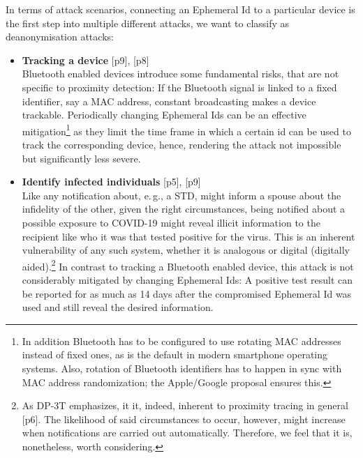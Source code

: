 \documentclass{llncs}
\begin{document}
In terms of attack scenarios, connecting an Ephemeral Id to a particular device is the first step into multiple different attacks, we want to classify as deanonymisation attacks:
\begin{itemize}
\item \textbf{Tracking a device}
  \cite{dp3t:psre}[p9], \cite{pepppt:dp3tana}[p8]\\
  Bluetooth enabled devices introduce some fundamental risks, that are not
  specific to proximity detection: If the Bluetooth signal is linked to a fixed
  identifier, say a MAC address, constant broadcasting makes
  a device trackable.
  Periodically changing Ephemeral Ids can be an effective mitigation\footnote{%
    In addition Bluetooth has to be configured to use rotating MAC addresses
    instead of fixed ones, as is the default in modern smartphone operating
    systems. Also, rotation of Bluetooth identifiers has to happen
    in sync with MAC address randomization; the Apple/Google proposal
    \cite{enf:bluetooth} ensures this.}
  as they limit the time frame in which a certain id can be used to
  track the corresponding device, hence, rendering the attack not impossible
  but significantly less severe.
\item \textbf{Identify infected individuals}
  \cite{dp3t:psre}[p5], \cite{pepppt:dp3tana}[p9]\\
  Like any notification about, e.\,g., a STD, might inform a spouse about the
  infidelity of the other, given the right circumstances, being notified about a
  possible exposure to COVID-19 might reveal illicit information to
  the recipient like who it was that tested positive for the virus.
  This is an inherent vulnerability of any such system,
  whether it is analogous or digital (digitally aided).\footnote{
    As DP-3T emphasizes, it it, indeed, inherent to proximity tracing in general
    \cite{dp3t:psre}[p6].
    The likelihood of said circumstances to occur, however,
    might increase when notifications are carried out automatically.
    Therefore, we feel that it is, nonetheless, worth considering.}
  In contrast to tracking a Bluetooth enabled device,
  this attack is not considerably mitigated by changing Ephemeral Ids:
  A positive test result can be reported for as much as 14 days after the
  compromised Ephemeral Id was used and still reveal the desired information.
\end{itemize}
\end{document}
